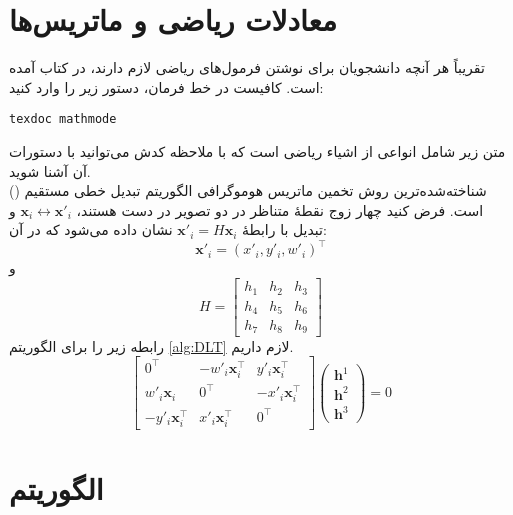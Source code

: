\section{معادلات ریاضی و ماتریس‌ها}
تقریباً هر آنچه دانشجویان برای نوشتن فرمول‌های ریاضی لازم دارند، در کتاب
آمده است. کافیست در خط فرمان، دستور زیر را وارد کنید:
\begin{latin}
  \texttt{texdoc mathmode}
\end{latin}
متن زیر شامل انواعی از اشیاء ریاضی است که با ملاحظه کدش می‌توانید با دستورات آن آشنا شوید.\\
شناخته‌شده‌ترین روش تخمین ماتریس هوموگرافی الگوریتم تبدیل خطی مستقیم () است.  فرض کنید چهار زوج نقطهٔ متناظر در دو تصویر در دست هستند،  $\mathbf{x}_i\leftrightarrow\mathbf{x}'_i$   و تبدیل با رابطهٔ
$\mathbf{x}'_i = H\mathbf{x}_i$
نشان داده می‌شود که در آن:
\[\mathbf{x}'_i=(x'_i,y'_i,w'_i)^\top  \]
و
\[ H=\left[
    \begin{array}{ccc}
      h_1 & h_2 & h_3 \\
      h_4 & h_5 & h_6 \\
      h_7 & h_8 & h_9
    \end{array}
    \right]\]
رابطه زیر را برای الگوریتم  \eqref{alg:DLT} لازم داریم.
\begin{equation}
  \label{eq:DLT_Ah}
  \left[
    \begin{array}{ccc}
      0^\top                  & -w'_i\mathbf{x}_i^\top & y'_i\mathbf{x}_i^\top  \\
      w'_i\mathbf{x}_i        & 0^\top                 & -x'_i\mathbf{x}_i^\top \\
      - y'_i\mathbf{x}_i^\top & x'_i\mathbf{x}_i^\top  & 0^\top
    \end{array}
    \right]
  \left(
  \begin{array}{c}
      \mathbf{h}^1 \\
      \mathbf{h}^2 \\
      \mathbf{h}^3
    \end{array}
  \right)=0
\end{equation}

\section{الگوریتم}

